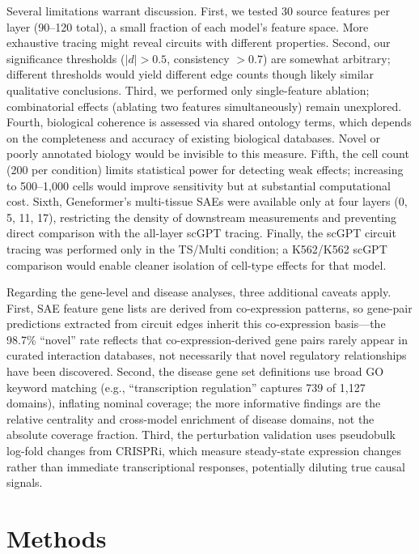 \documentclass[onecolumn]{article}
\begin{document}
Several limitations warrant discussion. First, we tested 30 source features per layer (90--120 total), a small fraction of each model's feature space. More exhaustive tracing might reveal circuits with different properties. Second, our significance thresholds ($|d| > 0.5$, consistency $> 0.7$) are somewhat arbitrary; different thresholds would yield different edge counts though likely similar qualitative conclusions. Third, we performed only single-feature ablation; combinatorial effects (ablating two features simultaneously) remain unexplored. Fourth, biological coherence is assessed via shared ontology terms, which depends on the completeness and accuracy of existing biological databases. Novel or poorly annotated biology would be invisible to this measure. Fifth, the cell count (200 per condition) limits statistical power for detecting weak effects; increasing to 500--1,000 cells would improve sensitivity but at substantial computational cost. Sixth, Geneformer's multi-tissue SAEs were available only at four layers (0, 5, 11, 17), restricting the density of downstream measurements and preventing direct comparison with the all-layer scGPT tracing. Finally, the scGPT circuit tracing was performed only in the TS/Multi condition; a K562/K562 scGPT comparison would enable cleaner isolation of cell-type effects for that model.

Regarding the gene-level and disease analyses, three additional caveats apply. First, SAE feature gene lists are derived from co-expression patterns, so gene-pair predictions extracted from circuit edges inherit this co-expression basis---the 98.7\% ``novel'' rate reflects that co-expression-derived gene pairs rarely appear in curated interaction databases, not necessarily that novel regulatory relationships have been discovered. Second, the disease gene set definitions use broad GO keyword matching (e.g., ``transcription regulation'' captures 739 of 1,127 domains), inflating nominal coverage; the more informative findings are the relative centrality and cross-model enrichment of disease domains, not the absolute coverage fraction. Third, the perturbation validation uses pseudobulk log-fold changes from CRISPRi, which measure steady-state expression changes rather than immediate transcriptional responses, potentially diluting true causal signals.


\section{Methods}
\end{document}
